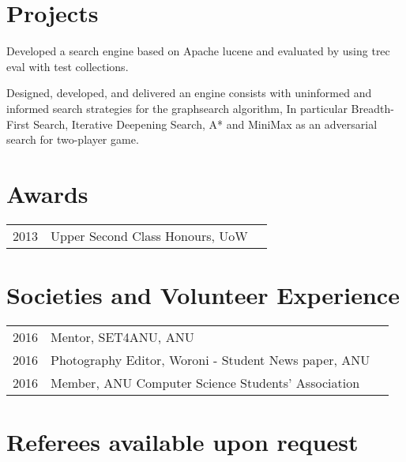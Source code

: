 \documentclass[]{pubudu-resume-openfont}
\begin{document}
\begin{minipage}[t]{0.66\textwidth}

\section{Projects}
Developed a search engine based on Apache lucene and evaluated by using trec eval with test collections.
\sectionsep

Designed, developed, and delivered an engine consists with uninformed and informed search strategies for the graphsearch
algorithm, In particular Breadth-First Search, Iterative Deepening Search, A* and MiniMax as an adversarial search
for two-player game.
\sectionsep


\section{Awards} 
\begin{tabular}{rll}
2013	     & Upper Second Class Honours, UoW\\

\end{tabular}
\sectionsep


\section{Societies and Volunteer Experience} 

\begin{tabular}{rll}
2016 	& Mentor, SET4ANU, ANU \\
2016    & Photography Editor, Woroni - Student News paper, ANU\\
2016    & Member, ANU Computer Science Students' Association\\

\end{tabular}
\sectionsep
\section{Referees available upon request} 

\end{minipage} 
\end{document}
